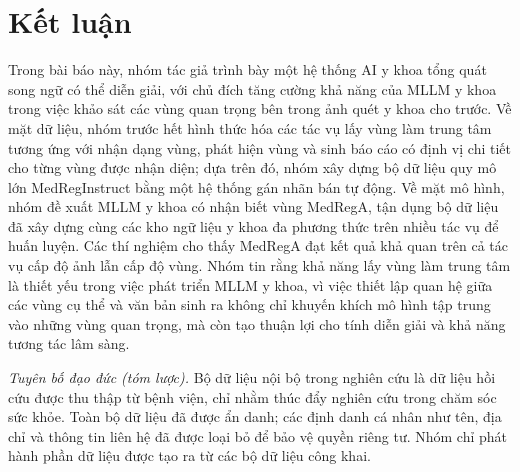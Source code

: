 \documentclass[12pt,a4paper,oneside]{extarticle}
\begin{document}
\section{Kết luận}

Trong bài báo này, nhóm tác giả trình bày một hệ thống AI y khoa tổng quát song ngữ có thể diễn
giải, với chủ đích tăng cường khả năng của MLLM y khoa trong việc khảo sát các vùng quan trọng
bên trong ảnh quét y khoa cho trước. Về mặt dữ liệu, nhóm trước hết hình thức hóa các tác vụ lấy
vùng làm trung tâm tương ứng với nhận dạng vùng, phát hiện vùng và sinh báo cáo có định vị chi
tiết cho từng vùng được nhận diện; dựa trên đó, nhóm xây dựng bộ dữ liệu quy mô lớn MedRegInstruct
bằng một hệ thống gán nhãn bán tự động. Về mặt mô hình, nhóm đề xuất MLLM y khoa có nhận biết vùng
MedRegA, tận dụng bộ dữ liệu đã xây dựng cùng các kho ngữ liệu y khoa đa phương thức trên nhiều
tác vụ để huấn luyện. Các thí nghiệm cho thấy MedRegA đạt kết quả khả quan trên cả tác vụ cấp độ
ảnh lẫn cấp độ vùng. Nhóm tin rằng khả năng lấy vùng làm trung tâm là thiết yếu trong việc phát
triển MLLM y khoa, vì việc thiết lập quan hệ giữa các vùng cụ thể và văn bản sinh ra không chỉ
khuyến khích mô hình tập trung vào những vùng quan trọng, mà còn tạo thuận lợi cho tính diễn giải
và khả năng tương tác lâm sàng.

\vspace{0.5cm}
\noindent\textit{Tuyên bố đạo đức (tóm lược).} Bộ dữ liệu nội bộ trong nghiên cứu là dữ liệu hồi
cứu được thu thập từ bệnh viện, chỉ nhằm thúc đẩy nghiên cứu trong chăm sóc sức khỏe. Toàn bộ dữ
liệu đã được ẩn danh; các định danh cá nhân như tên, địa chỉ và thông tin liên hệ đã được loại bỏ
để bảo vệ quyền riêng tư. Nhóm chỉ phát hành phần dữ liệu được tạo ra từ các bộ dữ liệu công khai.
\end{document}
